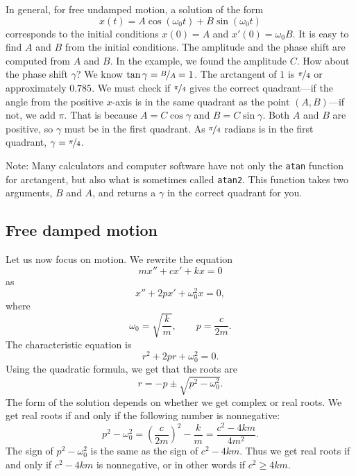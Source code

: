 In general, for free undamped motion, a solution of the
form
\begin{equation*}
x(t) = A \cos (\omega_0 t) + B \sin (\omega_0 t)
\end{equation*}
corresponds to the initial conditions $x(0) = A$ and $x'(0) = \omega_0 B$.
It is easy to find $A$ and $B$ from the initial
conditions. 
The amplitude and the phase shift are computed from $A$ and $B$.
In the example, we found the amplitude $C$.
How about the phase shift $\gamma$?
We know $\tan \gamma = \nicefrac{B}{A} = 1$.
The arctangent of $1$ is $\nicefrac{\pi}{4}$ or approximately $0.785$.
We must check if $\nicefrac{\pi}{4}$ gives the correct
quadrant---if the angle from the positive $x$-axis is in the same quadrant as the
point $(A,B)$---if not, we add $\pi$.
That is because $A = C \cos \gamma$ and $B = C \sin \gamma$.
Both $A$ and $B$ are positive, so $\gamma$ must be in the first
quadrant.  As $\nicefrac{\pi}{4}$ radians is in the first quadrant,
$\gamma = \nicefrac{\pi}{4}$.

Note: Many
calculators and computer software have not only the
\texttt{atan} function
for arctangent, but also what is sometimes called \texttt{atan2}.
This function
takes two arguments, $B$ and $A$, and returns a $\gamma$ in the
correct quadrant for you.

\subsection{Free damped motion}


Let us now focus on  motion.  We rewrite the equation
\begin{equation*}
m x'' + c x' + kx = 0
\end{equation*}
as
\begin{equation*}
x'' + 2p x' + \omega_0^2 x = 0,
\end{equation*}
where
\begin{equation*}
\omega_0 = \sqrt{\frac{k}{m}}, \qquad p = \frac{c}{2m} .
\end{equation*}
The characteristic equation is
\begin{equation*}
r^2 + 2 pr + \omega_0^2 = 0 .
\end{equation*}
Using the quadratic formula, we get that the roots are
\begin{equation*}
r = -p \pm \sqrt{p^2 - \omega_0^2} .
\end{equation*}
The form of the solution depends on whether we get complex or real roots.
We get real roots if and only if the following number is nonnegative:
\begin{equation*}
p^2 - \omega_0^2 = {\left( \frac{c}{2m} \right)}^2 - \frac{k}{m}
= \frac{c^2 - 4km}{4m^2} .
\end{equation*}
The sign of $p^2-\omega_0^2$ is the same as the sign of
$c^2 - 4km$.  Thus we get real roots if and only if $c^2-4km$ is
nonnegative, or in other words if $c^2 \geq 4km$.

